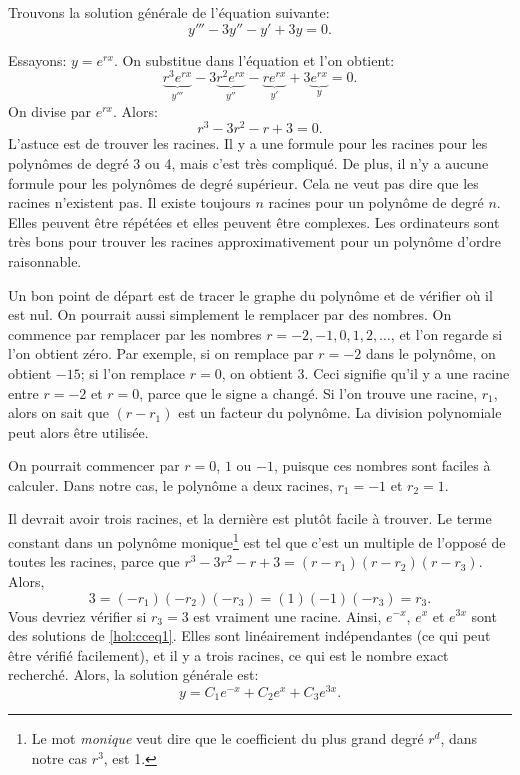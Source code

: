 \begin{example}
	Trouvons la solution générale de l'équation suivante:
	\begin{equation} \label{hol:cceq1}
		y''' - 3 y'' - y' + 3y = 0 .
	\end{equation}
	
	Essayons: $y = e^{rx}$. On substitue dans l'équation et l'on obtient:
	\begin{equation*}
		\underbrace{r^3 e^{rx}}_{y'''} - 3 \underbrace{r^2 e^{rx}}_{y''} -
		\underbrace{r e^{rx}}_{y'} + 3 \underbrace{e^{rx}}_{y} = 0 .
	\end{equation*}
	On divise par $e^{rx}$.  Alors: 
	\begin{equation*}
		r^3 - 3 r^2 - r + 3 = 0 .
	\end{equation*}
	L'astuce est de trouver les racines. Il y a une formule pour les racines pour les polynômes de degré 3 ou 4, mais c'est très compliqué. De plus, il n'y a aucune formule pour les polynômes de degré supérieur. Cela ne veut pas dire que les racines n'existent pas. Il existe toujours 
	$n$ racines pour un polynôme de degré  $n$.  Elles peuvent être répétées 
	et elles peuvent être complexes. Les ordinateurs sont très bons pour trouver les racines approximativement pour un polynôme d'ordre  raisonnable.
	
	Un bon point de départ est de tracer le graphe du polynôme et de vérifier où il est nul.
	On pourrait aussi simplement le remplacer par des nombres. 
	On commence par remplacer par les nombres  $r=-2, -1, 0, 1, 2, \ldots$, et l'on regarde si l'on obtient zéro. 
	Par exemple, si on remplace par $r=-2$ dans le polynôme, on obtient $-15$; si l'on remplace $r=0$, on obtient 3.
	Ceci signifie qu'il y a une racine entre $r=-2$ et $r=0$,
	parce que le signe a changé.
	Si l'on trouve une racine, $r_1$, alors on sait que $(r-r_1)$ est un facteur du polynôme. La division polynomiale peut alors être utilisée. 
	
	On pourrait commencer par $r=0$, $1$ ou $-1$, puisque ces nombres sont faciles à calculer. Dans notre cas, le polynôme a deux racines,  $r_1 = -1$
	et $r_2 = 1$.  
	
	Il devrait avoir trois racines, et la dernière est plutôt facile à trouver. Le terme constant dans un polynôme monique\footnote{Le mot \emph{monique} veut dire que le coefficient du plus grand degré $r^d$, dans notre cas $r^3$, est 1.}
	est tel que c'est un multiple de l'opposé de toutes les racines, parce que 
	$r^3 - 3 r^2 - r + 3 = (r-r_1)(r-r_2)(r-r_3)$.
	Alors,
	\begin{equation*}
		3 = (-r_1)(-r_2)(-r_3) = (1)(-1)(-r_3) = r_3 .
	\end{equation*}
	Vous devriez vérifier si  $r_3 = 3$ est vraiment une racine.  
	Ainsi, $e^{-x}$, $e^{x}$
	et $e^{3x}$ sont des solutions de \eqref{hol:cceq1}.  
	Elles sont linéairement indépendantes (ce qui peut être vérifié facilement), et il y a trois racines, 
	ce qui est le nombre exact recherché. 
	Alors, la solution générale est: 
	\begin{equation*}
		y = C_1 e^{-x} + C_2 e^{x} + C_3 e^{3x} .
	\end{equation*}
	

\end{example}
